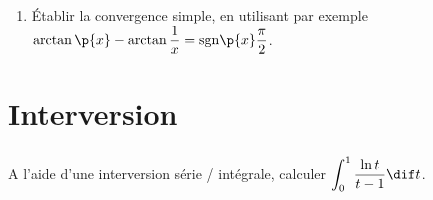 \documentclass[a4paper,french,bookmarks]{book}
\begin{document}
    \begin{enumerate}
        \item Établir la convergence simple, en utilisant par exemple $\arctan\p{x} - \arctan{\dfrac{1}{x}} = \mathrm{sgn}\p{x}\dfrac{\pi}{2}$.
        
    \end{enumerate}
    
    \chapter{Interversion}
    
    \subsection{}
    
    A l’aide d’une interversion série / intégrale, calculer $\displaystyle\int_0^1 \dfrac{\ln t}{t- 1}\dif t$.
    
\end{document}
